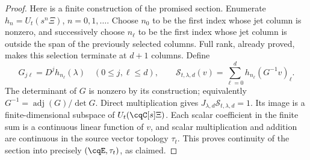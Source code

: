 \begin{proof}
Here is a finite construction of the promised section. Enumerate
$h_n=U_t(s^n\Xi)$, $n=0,1,\ldots$. Choose $n_0$ to be
the first index whose jet column is nonzero, and successively
choose $n_\ell$ to be the first index whose jet column is
outside the span of the previously selected columns.
Full rank, already proved, makes this selection terminate
at $d+1$ columns. Define
\begin{equation}
 G_{j\ell}=D^jh_{n_\ell}(\lambda)
 \quad(0\le j,\ell\le d),\qquad
 \mathcal S_{t,\lambda,d}(v)
   =\sum_{\ell=0}^d h_{n_\ell}(G^{-1}v)_\ell.
 \label{eq:cq-moving-jet-finite-section}
\end{equation}
The determinant of $G$ is nonzero by its construction;
equivalently $G^{-1}=\operatorname{adj}(G)/\det G$.
Direct multiplication gives
$J_{\lambda,d}\mathcal S_{t,\lambda,d}=1$.
Its image is a finite-dimensional subspace of
$U_t(\cqC[s]\Xi)$. Each scalar coefficient in the finite
sum is a continuous linear function of $v$, and scalar
multiplication and addition are continuous in the source
vector topology $\tau_t$. This proves continuity of the
section into precisely $(\cqE,\tau_t)$, as claimed.
\end{proof}

